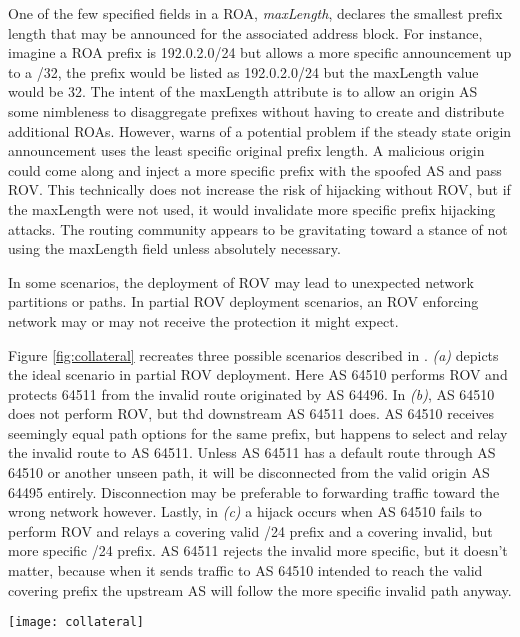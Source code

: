 \documentclass[sigconf]{acmart}
\begin{document}
One of the few specified fields in a ROA, \emph{maxLength}, declares the
smallest prefix length that may be announced for the associated address
block.  For instance, imagine a ROA prefix is 192.0.2.0/24 but allows a
more specific announcement up to a /32, the prefix would be listed as
192.0.2.0/24 but the maxLength value would be 32.  The intent of the
maxLength attribute is to allow an origin AS some nimbleness to
disaggregate prefixes without having to create and distribute additional
ROAs.  However, \cite{gilad_are_2017} warns of a potential problem if
the steady state origin announcement uses the least specific original
prefix length.  A malicious origin could come along and inject a more
specific prefix with the spoofed AS and pass ROV.  This technically does
not increase the risk of hijacking without ROV, but if the maxLength
were not used, it would invalidate more specific prefix hijacking
attacks.  The routing community appears to be gravitating toward a
stance of not using the maxLength field unless absolutely necessary.

In some scenarios, the deployment of ROV may lead to unexpected network
partitions or paths.  In partial ROV deployment scenarios, an ROV
enforcing network may or may not receive the protection it might expect.

Figure \ref{fig:collateral} recreates three possible scenarios described
in \cite{gilad_are_2017}.  \emph{(a)} depicts the ideal scenario in
partial ROV deployment.  Here AS 64510 performs ROV and protects 64511
from the invalid route originated by AS 64496.  In \emph{(b)}, AS 64510
does not perform ROV, but thd downstream AS 64511 does.  AS 64510
receives seemingly equal path options for the same prefix, but happens
to select and relay the invalid route to AS 64511.  Unless AS 64511 has
a default route through AS 64510 or another unseen path, it will be
disconnected from the valid origin AS 64495 entirely.  Disconnection may
be preferable to forwarding traffic toward the wrong network however.
Lastly, in \emph{(c)} a hijack occurs when  AS 64510 fails to perform
ROV and relays a covering valid /24 prefix and a covering invalid, but
more specific /24 prefix.   AS 64511 rejects the invalid more specific,
but it doesn't matter, because when it sends traffic to AS 64510
intended to reach the valid covering prefix the upstream AS  will follow
the more specific invalid path anyway.

\begin{figure*}
  \centering
    \texttt{[image: collateral]}
  \caption{Partial ROV adoption scenarios}
  \label{fig:collateral}
\end{figure*}
\end{document}

